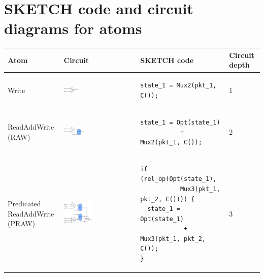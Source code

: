 \appendix
\section{SKETCH code and circuit diagrams for atoms}

\onecolumn
\begin{scriptsize}
\begin{longtable}{|p{}|p{}|p{}|p{}|}
      \hline
      Atom & Circuit & SKETCH code & Circuit depth \\

\hline
Write &
\includegraphics[width=0.2\textwidth]{rw.pdf} &
{\begin{lstlisting}[style=customctable]
  state_1 = Mux2(pkt_1, C());
 \end{lstlisting}} &
1 \\

\hline
ReadAddWrite (RAW) &
\includegraphics[width=0.3\textwidth]{raw.pdf} &
{\begin{lstlisting}[style=customctable]
 state_1 = Opt(state_1)
           + Mux2(pkt_1, C());
 \end{lstlisting}} &
2\\

\hline
\pbox{0.1\textwidth}
{Predicated\\
ReadAddWrite (PRAW)} &
\includegraphics[width=0.4\textwidth]{pred_raw.pdf}  &
{\begin{lstlisting}[style=customctable]
if (rel_op(Opt(state_1),
           Mux3(pkt_1, pkt_2, C()))) {
  state_1 = Opt(state_1)
            + Mux3(pkt_1, pkt_2, C());
}
\end{lstlisting}} &
3\\


\end{longtable}
\end{scriptsize}
